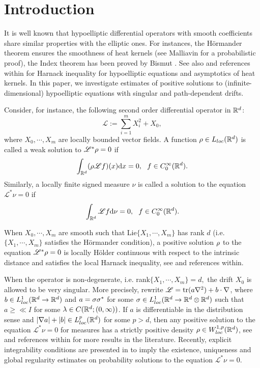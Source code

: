 \documentclass[12pt,leqno]{article}
\theoremstyle{definition}
\newcommand{\scr}[1]{\mathscr #1}
\numberwithin{equation}{section} \theoremstyle{remark}
\begin{document}
\section{Introduction}

It is well known that hypoelliptic  differential operators with smooth coefficients share similar  properties  with the elliptic ones. For instances, the H\"ormander theorem \cite{H} ensures the    smoothness of heat kernels (see Malliavin \cite{Ma} for a probabilistic proof),  the Index theorem has been proved  by Bismut \cite{B}. See also  \cite{NN, SK1, SK2} and references within for Harnack inequality for hypoelliptic equations and asymptotics of heat kernels.  In this paper, we investigate estimates of positive solutions to (infinite-dimensional) hypoelliptic equations with   singular and path-dependent drifts.

Consider, for instance,  the following second order differential operator in $\mathbb R^d$:
$$\scr L := \sum_{i=1}^m X_i^2 +X_0,$$ where $X_0,\cdots, X_m$  are locally bounded  vector fields. A function $\rho\in L_{loc} (\mathbb R^d)$   is called a weak solution to $\scr L^*\rr=0$ if
$$\int_{\R^d} (\rr \scr L f)(x)\d x=0,\ \ f\in C_0^\infty(\R^d).$$
Similarly, a locally finite signed measure $\nu$ is called a solution to the equation $\scr L^*\nu=0$ if
$$\int_{\R^d}  \scr L f \d \nu =0,\ \ f\in C_0^\infty(\R^d).$$

When $X_0,\cdots, X_m$ are smooth such that Lie$\{X_1,\cdots, X_m\}$ has rank $d$ (i.e. $\{X_1,\cdots, X_m\}$ satisfies the H\"ormander condition), a positive solution $\rho$ to the equation $\scr L^*\rr=0$ is locally H\"older continuous with respect to the intrinsic distance and satisfies the local Harnack inequality, see \cite{NN} and references within.

When the operator is non-degenerate, i.e. rank$\{X_1,\cdots, X_m\}=d,$ the drift $X_0$ is allowed to be very singular. More precisely, rewrite $\scr L= {\rm tr}(a\nn^2) +b\cdot\nn$, where $b\in L^1_{loc}(\mathbb R^d\rightarrow \mathbb R^d)$ and $a=\sigma\sigma^*$  for some $\sigma\in L_{loc}^1(\mathbb R^d\rightarrow \mathbb R^d\otimes\mathbb R^d)$ such that $a\ge \ll I$ for some $\lambda\in C(\mathbb R^d; (0,\infty))$. If $a$ is differentiable in the distribution sense and $|\nabla a|+ |b|\in L_{loc}^p(\mathbb R^d)$ for some $p>d$, then
any positive solution to the equation $\scr L^*\nu=0$ for measures has a strictly positive density $\rho \in W^{1,p}_{loc}(\mathbb R^d)$, see \cite{BKR, BR} and references within for more results in the literature.
Recently, explicit integrability conditions are presented in \cite{W16} to imply the existence, uniqueness and global regularity estimates on probability solutions to the equation $\scr L^*\nu=0$.
\end{document}
